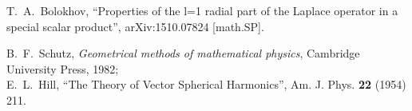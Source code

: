 \documentclass[12pt]{article}
\begin{document}
\begin{thebibliography}{0}
 T.~A.~Bolokhov,
``Properties of the l=1 radial part of the Laplace operator in a special
scalar product'', arXiv:1510.07824 [math.SP].
    
    B.~F.~Schutz, \emph{Geometrical methods of mathematical physics},
    Cambridge University Press, 1982;\\
    E.~L.~Hill, ``The Theory of Vector Spherical Harmonics'',
    Am. J. Phys. {\bf 22} (1954) 211.




    

\end{thebibliography}
\end{document}
